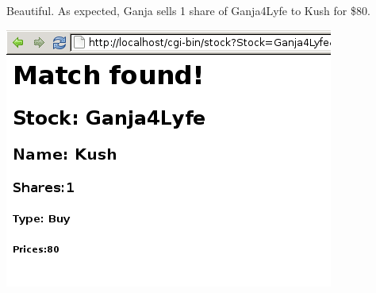 Beautiful. As expected, Ganja sells 1 share of Ganja4\+Lyfe to Kush for \$80.

 
\includegraphics[scale=0.5]{../test14.png}
 